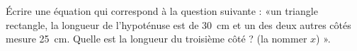 
\begin{exercice}\label{exo2smath-0287}

    Écrire une équation qui correspond à la question suivante : «un triangle rectangle, la longueur de l'hypoténuse est de \SI{30}{\centi\meter} et un des deux autres côtés mesure \SI{25}{\centi\meter}. Quelle est la longueur du troisième côté ? (la nommer \( x\)) ».

\end{exercice}
